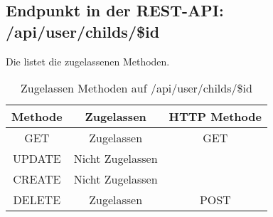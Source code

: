 \subsection{Endpunkt in der REST-API: /api/user/childs/\$id}
Die  listet die zugelassenen Methoden. 

\begin{table}[!htbp]
	\begin{tabular}{|c|c|c|}
		\hline
			\textbf{Methode} & \textbf{Zugelassen} & \textbf{HTTP Methode} \\ \hline
			GET & Zugelassen & GET \\ \hline
			UPDATE & Nicht Zugelassen & \\ \hline 
			CREATE & Nicht Zugelassen & \\ \hline 
			DELETE & Zugelassen & POST \\ \hline
	\end{tabular}

		\caption{Zugelassen Methoden auf /api/user/childs/\$id}
		\label{tab:end:rest:api:user:childs:id:meth}
\end{table}